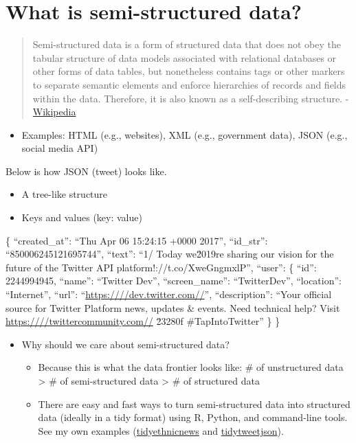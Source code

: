 \documentclass[
]{book}
\providecommand{\tightlist}{%
  \setlength{\itemsep}{0pt}\setlength{\parskip}{0pt}}
\begin{document}
\hypertarget{what-is-semi-structured-data}{%
\section{What is semi-structured data?}\label{what-is-semi-structured-data}}

\begin{quote}
Semi-structured data is a form of structured data that does not obey the tabular structure of data models associated with relational databases or other forms of data tables, but nonetheless contains tags or other markers to separate semantic elements and enforce hierarchies of records and fields within the data. Therefore, it is also known as a self-describing structure. - \href{https://en.wikipedia.org/wiki/Semi-structured_data\#:~:text=Semi\%2Dstructured\%20data\%20is\%20a,and\%20fields\%20within\%20the\%20data.}{Wikipedia}
\end{quote}

\begin{itemize}
\tightlist
\item
  Examples: HTML (e.g., websites), XML (e.g., government data), JSON (e.g., social media API)
\end{itemize}

Below is how JSON (tweet) looks like.

\begin{itemize}
\item
  A tree-like structure
\item
  Keys and values (key: value)
\end{itemize}

\{
``created\_at'': ``Thu Apr 06 15:24:15 +0000 2017'',
``id\_str'': ``850006245121695744'',
``text'': ``1/ Today we\u2019re sharing our vision for the future of the Twitter API platform!\nhttps://t.co/XweGngmxlP'',
``user'': \{
``id'': 2244994945,
``name'': ``Twitter Dev'',
``screen\_name'': ``TwitterDev'',
``location'': ``Internet'',
``url'': ``\url{https:////dev.twitter.com//}'',
``description'': ``Your official source for Twitter Platform news, updates \& events. Need technical help? Visit \url{https:////twittercommunity.com//} \u2328\ufe0f \#TapIntoTwitter''
\}
\}

\begin{itemize}
\item
  Why should we care about semi-structured data?

  \begin{itemize}
  \tightlist
  \item
    Because this is what the data frontier looks like: \# of unstructured data \textgreater{} \# of semi-structured data \textgreater{} \# of structured data
  \item
    There are easy and fast ways to turn semi-structured data into structured data (ideally in a tidy format) using R, Python, and command-line tools. See my own examples (\href{https://github.com/jaeyk/tidyethnicnews}{tidyethnicnews} and \href{https://github.com/jaeyk/tidytweetjson}{tidytweetjson}).
  \end{itemize}
\end{itemize}
\end{document}
